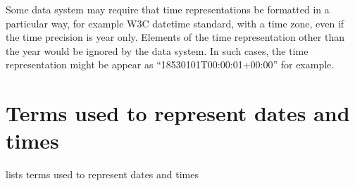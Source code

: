 \documentclass[letterpaper,10pt,english]{sphinxmanual}
\begin{document}
\sphinxAtStartPar
{}  Some data system may require that time representations
be formatted in a particular way, for example W3C datetime standard, with a time zone,
even if the time precision is year only.  Elements of the time representation other
than the year would be ignored by the data system.  In such cases, the time representation
might be appear as “1853\sphinxhyphen{}01\sphinxhyphen{}01T00:00:01+00:00” for example.


\section{Terms used to represent dates and times}
\label{\detokenize{datetimes:terms-used-to-represent-dates-and-times}}
\sphinxAtStartPar
{\hyperref[\detokenize{datetimes:table-13}]{}} lists terms used to represent dates and times
\end{document}
